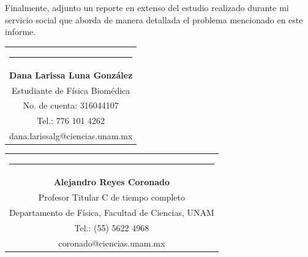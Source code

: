 \documentclass[9pt,letterpaper]{article}
\begin{document}
Finalmente, adjunto un reporte en extenso del estudio realizado durante mi servicio social que aborda de manera detallada el problema mencionado en este informe.	
	
	{\vspace{3cm}\begin{tabular} { c}
			\setlength{\tabcolsep}{15pt}
			\renewcommand{\arraystretch}{1}
			\noindent\rule{5.5cm}{0.4pt}\qquad \\
			
			\qquad  \textbf{Dana Larissa Luna González} \qquad \\
			\qquad Estudiante de Física Biomédica  \qquad \\ \qquad 
			No. de cuenta: 316044107\qquad \\  
			\qquad  Tel.: 776 101 4262 \qquad \\
			\qquad dana.larissalg@ciencias.unam.mx \qquad \\
			
		\end{tabular}
	}
	
	{\vspace{-2.9cm}\hspace{7cm}\begin{tabular} { c}
			\setlength{\tabcolsep}{15pt}
			\renewcommand{\arraystretch}{1}
			\noindent\rule{5.5cm}{0.4pt}\qquad \\
			
			\qquad  \textbf{Alejandro Reyes Coronado} \qquad \\
			\qquad Profesor Titular C de tiempo completo  \qquad \\  
			\qquad Departamento de Física, Facultad de Ciencias, UNAM\qquad \\ 
			\qquad  Tel.: (55) 5622 4968 \qquad \\
			\qquad coronado@ciencias.unam.mx \qquad \\
			
		\end{tabular}
		
	}
	
	
	
	
	
	
	
	
	
	
	
	
	
	
	
	
	
	
	
	
	
	
	
	
	
	
	
	
	
	
\end{document}
